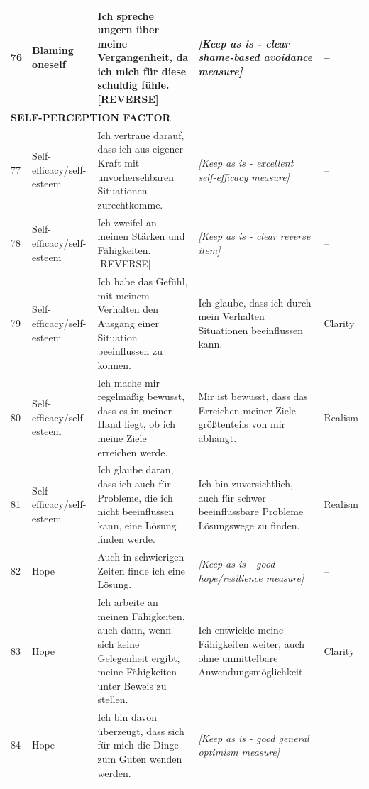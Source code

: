 \documentclass[12pt,a4paper]{article}
\begin{document}
\begin{longtable}{p{}p{}p{}p{}p{}}
76 & Blaming oneself & Ich spreche ungern über meine Vergangenheit, da ich mich für diese schuldig fühle. [REVERSE] & \textit{[Keep as is - clear shame-based avoidance measure]} & -- \\

\midrule
\multicolumn{5}{l}{\textbf{SELF-PERCEPTION FACTOR}} \\
\midrule

77 & Self-efficacy/self-esteem & Ich vertraue darauf, dass ich aus eigener Kraft mit unvorhersehbaren Situationen zurechtkomme. & \textit{[Keep as is - excellent self-efficacy measure]} & -- \\

78 & Self-efficacy/self-esteem & Ich zweifel an meinen Stärken und Fähigkeiten. [REVERSE] & \textit{[Keep as is - clear reverse item]} & -- \\

79 & Self-efficacy/self-esteem & Ich habe das Gefühl, mit meinem Verhalten den Ausgang einer Situation beeinflussen zu können. & Ich glaube, dass ich durch mein Verhalten Situationen beeinflussen kann. & Clarity \\

80 & Self-efficacy/self-esteem & Ich mache mir regelmäßig bewusst, dass es in meiner Hand liegt, ob ich meine Ziele erreichen werde. & Mir ist bewusst, dass das Erreichen meiner Ziele größtenteils von mir abhängt. & Realism \\

81 & Self-efficacy/self-esteem & Ich glaube daran, dass ich auch für Probleme, die ich nicht beeinflussen kann, eine Lösung finden werde. & Ich bin zuversichtlich, auch für schwer beeinflussbare Probleme Lösungswege zu finden. & Realism \\

82 & Hope & Auch in schwierigen Zeiten finde ich eine Lösung. & \textit{[Keep as is - good hope/resilience measure]} & -- \\

83 & Hope & Ich arbeite an meinen Fähigkeiten, auch dann, wenn sich keine Gelegenheit ergibt, meine Fähigkeiten unter Beweis zu stellen. & Ich entwickle meine Fähigkeiten weiter, auch ohne unmittelbare Anwendungsmöglichkeit. & Clarity \\

84 & Hope & Ich bin davon überzeugt, dass sich für mich die Dinge zum Guten wenden werden. & \textit{[Keep as is - good general optimism measure]} & -- \\


\end{longtable}
\end{document}
